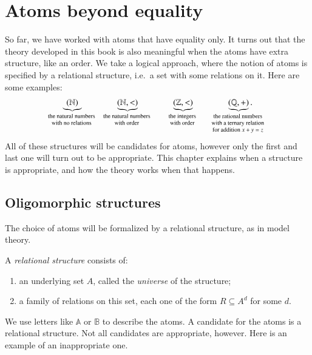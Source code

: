 \chapter{Atoms beyond equality}
\label{ch:beyond-equality}

So far, we have worked with atoms that have equality only. It turns out that the theory developed in this book is also meaningful when the atoms have extra structure, like an order.  We take a logical approach, where the notion of atoms is specified by a relational structure, i.e.~a set with some relations on it. Here are some examples: 
\begin{align*}
    \myunderbrace{(\Nat)}{the natural numbers\\ with no relations}
  \qquad \qquad 
\myunderbrace{(\Nat, <)}{the natural numbers\\ with order}
  \qquad \qquad 
  \myunderbrace{(\Int, <)}{the integers \\ with order} 
  \qquad \qquad \myunderbrace{
    (\mathbb Q, +)
  }{the rational numbers \\ with a ternary relation\\ for addition $x+y=z$}.
\end{align*}
All of these structures will be candidates for atoms, however only the first and last one will turn out to be appropriate. This chapter explains when a structure is appropriate, and how the theory works when that happens.



\section{Oligomorphic structures}
\label{sec:oligomorphic}
The choice of atoms will be formalized by a relational structure, as in model theory. 
\begin{definition}\label{def:relational-structure}
	A \emph{relational structure} consists of: 
\begin{enumerate}
	\item an underlying set $A$, called the \emph{universe} of the structure;
	\item a family of relations on this set, each one of the form $R \subseteq A^d$ for some $d$. 
\end{enumerate}
\end{definition}

We use letters like $\mathbb A$ or $\mathbb B$ to describe the atoms. 
A candidate for the atoms is a relational structure. Not all candidates are appropriate, however. Here is an example of an inappropriate one.

